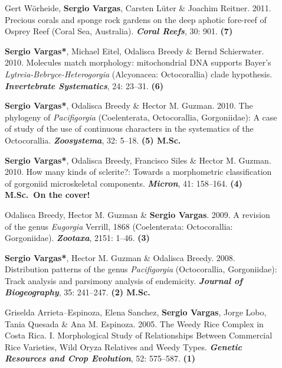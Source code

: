 \documentclass[letter,10pt]{article}
\begin{document}
\begin{description}
\item[]Gert W\"orheide, \textbf{Sergio Vargas}, Carsten L\"uter \& Joachim Reitner. 2011. Precious corals and sponge rock gardens on the deep aphotic fore-reef of Osprey Reef (Coral Sea, Australia). \textbf{\emph{Coral Reefs}}, 30: 901. \hfill\textbf{{\scriptsize (7)}}

\item[]\textbf{Sergio Vargas*}, Michael Eitel, Odalisca Breedy \& Bernd Schierwater. 2010. Molecules match morphology: mitochondrial DNA supports Bayer's \emph{Lytreia-Bebryce-Heterogorgia} (Alcyonacea: Octocorallia) clade hypothesis. \textbf{\emph{Invertebrate Systematics}}, 24: 23--31. \hfill\textbf{{\scriptsize (6)}}

\item[]\textbf{Sergio Vargas*}, Odalisca Breedy \& Hector M. Guzman. 2010. The phylogeny of \emph{Pacifigorgia} (Coelenterata, Octocorallia, Gorgoniidae): A case of study of the use of continuous characters in the systematics of the Octocorallia. \textbf{\emph{Zoosystema}}, 32: 5--18. \hfill\textbf{{\scriptsize (5) M.Sc.}}

\item[]\textbf{Sergio Vargas*}, Odalisca Breedy, Francisco Siles \& Hector M. Guzman. 2010. How many kinds of sclerite?: Towards a morphometric classification of gorgoniid microskeletal components. \textbf{\emph{Micron}}, 41: 158--164. \hfill\textbf{{\scriptsize (4) M.Sc.~On the cover!}}

\item[]Odalisca Breedy, Hector M. Guzman \& \textbf{Sergio Vargas}. 2009. A revision of the genus \emph{Eugorgia} Verrill, 1868 (Coelenterata: Octocorallia: Gorgoniidae). \textbf{\emph{Zootaxa}}, 2151: 1--46. \hfill\textbf{{\scriptsize (3)}}

\item[]\textbf{Sergio Vargas*}, Hector M. Guzman \& Odalisca Breedy. 2008. Distribution patterns of the genus \emph{Pacifigorgia} (Octocorallia, Gorgoniidae): Track analysis and parsimony analysis of endemicity. \textbf{\emph{Journal of Biogeography}}, 35: 241--247. \hfill\textbf{{\scriptsize (2) M.Sc.}}

\item[]Griselda Arrieta--Espinoza, Elena Sanchez, \textbf{Sergio Vargas}, Jorge Lobo, Tania Quesada \& Ana M. Espinoza. 2005. The Weedy Rice Complex in Costa Rica. I. Morphological Study of Relationships Between Commercial Rice Varieties, Wild Oryza Relatives and Weedy Types. \textbf{\emph{Genetic Resources and Crop Evolution}}, 52: 575--587. \hfill\textbf{{\scriptsize (1)}}
\end{description}
\end{document}

